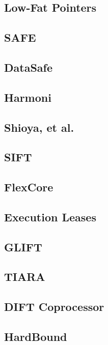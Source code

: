 \subsection{Low-Fat Pointers}

\subsection{SAFE}

\subsection{DataSafe}

\subsection{Harmoni}

\subsection{Shioya, et al.}

\subsection{SIFT}

\subsection{FlexCore}

\subsection{Execution Leases}

\subsection{GLIFT}

\subsection{TIARA}

\subsection{DIFT Coprocessor}

\subsection{HardBound}

